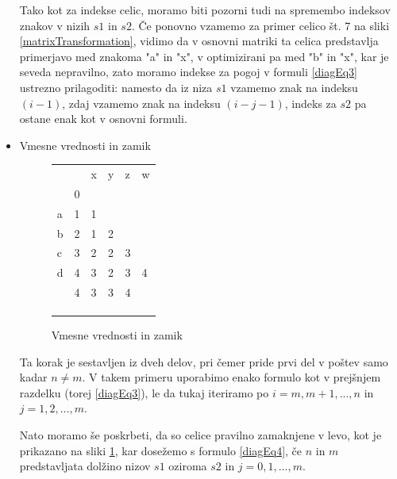 \documentclass[a4paper,12pt,openright]{book}
\begin{document}
\begin{itemize}
Tako kot za indekse celic, moramo biti pozorni tudi na spremembo indeksov znakov v nizih $s1$ in $s2$. Če ponovno vzamemo za primer celico št. 7 na sliki \ref{matrixTransformation}, vidimo da v osnovni matriki ta celica predstavlja primerjavo med znakoma "a" in "x", v optimizirani pa med "b" in "x", kar je seveda nepravilno, zato moramo indekse za pogoj v formuli \ref{diagEq3} ustrezno prilagoditi: namesto da iz niza $s1$ vzamemo znak na indeksu $(i-1)$, zdaj vzamemo znak na indeksu $(i-j-1)$, indeks za $s2$ pa ostane enak kot v osnovni formuli. 

    \item Vmesne vrednosti in zamik
    
\begin{figure}[htb]
\centering
\begin{tabular}{|l|l|l|l|l|l|}
\cline{3-6}
\multicolumn{2}{c|}{} & x & y & z & w \\ \cline{2-6}
\multicolumn{1}{c|}{} & 0 & \multicolumn{4}{c}{} \\ \cline{1-3}
a  & 1 & 1 & \multicolumn{3}{c}{} \\ \cline{1-4}
b  & 2 & 1 & 2 & \multicolumn{2}{c}{} \\ \cline{1-5}
c  & 3 & 2 & 2 & 3 & \multicolumn{1}{c}{} \\ \cline{1-6}
d  & 4 & 3 & 2 & 3 & 4 \\ \hline
 \multicolumn{1}{c|}{} & \cellcolor{blue!15}4 & \cellcolor{blue!15}3 & \cellcolor{blue!15}3 & \cellcolor{blue!15}4 & \multicolumn{1}{c}{} \\ \cline{2-5}
\multicolumn{1}{c|}{} & & & & \multicolumn{2}{c}{} \\ \cline{2-4}
\multicolumn{1}{c|}{} & & & \multicolumn{3}{c}{} \\ \cline{2-3}
\multicolumn{1}{c|}{} & & \multicolumn{4}{c}{} \\ \cline{2-2}
\end{tabular}
\caption{Vmesne vrednosti in zamik}
\label{diagMemory3}
\end{figure}

Ta korak je sestavljen iz dveh delov, pri čemer pride prvi del v poštev samo kadar $n \neq m$. V takem primeru uporabimo enako formulo kot v prejšnjem razdelku (torej \ref{diagEq3}), le da tukaj iteriramo po $i=m,m+1,...,n$ in $j=1,2,...,m$. 

Nato moramo še poskrbeti, da so celice pravilno zamaknjene v levo, kot je prikazano na sliki \ref{diagMemory3}, kar dosežemo s formulo \ref{diagEq4}, če $n$ in $m$ predstavljata dolžino nizov $s1$ oziroma $s2$ in $j=0,1,...,m$.


\end{itemize}
\end{document}
